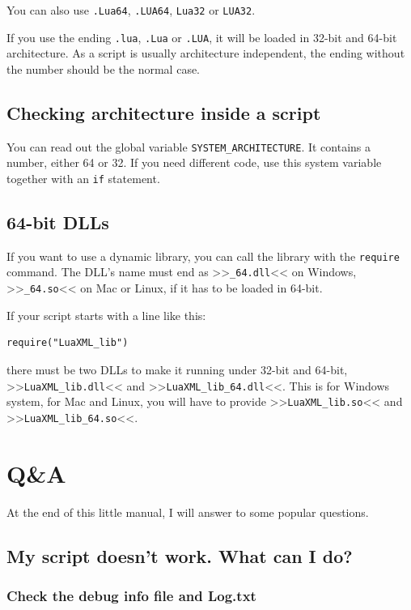 \documentclass[11pt,parskip=half,a4paper]{scrartcl}
\begin{document}
You can also use \verb|.Lua64|, \verb|.LUA64|, \verb|Lua32| or \verb|LUA32|.

If you use the ending \verb|.lua|, \verb|.Lua| or \verb|.LUA|, it will be loaded in 32-bit and 64-bit architecture. As a script is usually architecture independent, the ending without the number should be the normal case.

\subsection{Checking architecture inside a script}

You can read out the global variable \verb|SYSTEM_ARCHITECTURE|. It contains a number, either 64 or 32. If you need different code, use this system variable together with an \verb|if| statement.

\subsection{64-bit DLLs}

If you want to use a dynamic library, you can call the library with the \verb|require| command. The DLL's name must end as >>\verb|_64.dll|<< on Windows, >>\verb|_64.so|<< on Mac or Linux, if it has to be loaded in 64-bit.

If your script starts with a line like this:

\begin{lstlisting}[firstnumber=1]
require("LuaXML_lib")
\end{lstlisting}

there must be two DLLs to make it running under 32-bit and 64-bit, >>\verb|LuaXML_lib.dll|<< and >>\verb|LuaXML_lib_64.dll|<<. This is for Windows system, for Mac and Linux, you will have to provide >>\verb|LuaXML_lib.so|<< and >>\verb|LuaXML_lib_64.so|<<.

\newpage
\section{Q\&A}

At the end of this little manual, I will answer to some popular questions.

\subsection{My script doesn't work. What can I do?}

\subsubsection{Check the debug info file and Log.txt}
\end{document}
